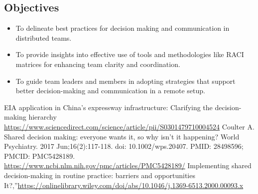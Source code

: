 \documentclass[12pt]{article}
\begin{document}
\subsection{Objectives}
\begin{itemize}
  \item To delineate best practices for decision making and communication in distributed teams.
  \item To provide insights into effective use of tools and methodologies like RACI matrices for enhancing team clarity and coordination.
  \item To guide team leaders and members in adopting strategies that support better decision-making and communication in a remote setup.
\end{itemize}

\begin{thebibliography}{8}
    EIA application in China’s expressway infrastructure: Clarifying the decision-making hierarchy \url{https://www.sciencedirect.com/science/article/pii/S0301479710004524}
    Coulter A. Shared decision making: everyone wants it, so why isn't it happening? World Psychiatry. 2017 Jun;16(2):117-118. doi: 10.1002/wps.20407. PMID: 28498596; PMCID: PMC5428189. \url{https://www.ncbi.nlm.nih.gov/pmc/articles/PMC5428189/} 
    Implementing shared decision-making in routine practice: barriers and opportunities It?,”\url{https://onlinelibrary.wiley.com/doi/abs/10.1046/j.1369-6513.2000.00093.x}
    
\end{thebibliography}
\end{document}
